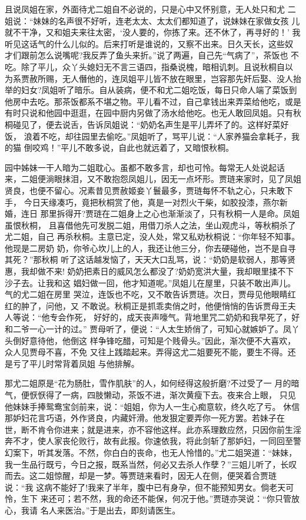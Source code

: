 且说凤姐在家，外面待尤二姐自不必说的，只是心中又怀别意，无人处只和尤
二姐说：“妹妹的名声很不好听，连老太太、太太们都知道了，说妹妹在家做女孩
儿就不干净，又和姐夫来往太密，‘没人要的，你拣了来。还不休了，再寻好的！’
我听见这话气的什么儿似的。后来打听是谁说的，又察不出来。日久天长，这些奴
才们跟前怎么说嘴呢?我反弄了鱼头来折。”说了两遍，自己先“气病了”，茶饭也
不吃。除了平儿，众丫头媳妇无不言三语四，指桑说槐，暗相讥刺。且说秋桐自以
为系贾赦所赐，无人僭他的，连凤姐平儿皆不放在眼里，岂容那先奸后娶、没人抬
举的妇女?凤姐听了暗乐。自从装病，便不和尤二姐吃饭，每日只命人端了菜饭到
他房中去吃。那茶饭都系不堪之物。平儿看不过，自己拿钱出来弄菜给他吃，或是
有时只说和他园中逛逛，在园中厨内另做了汤水给他吃。也无人敢回凤姐。只有秋
桐碰见了，便去说舌，告诉凤姐说：“奶奶名声生是平儿弄坏了的。这样好菜好饭，
浪着不吃，却往园里去偷吃。”凤姐听了，骂平儿说：“人家养猫会拿耗子，我的猫
倒咬鸡！”平儿不敢多说，自此也就远着了，又暗恨秋桐。

园中姊妹一干人暗为二姐耽心。虽都不敢多言，却也可怜。每常无人处说起话
来，二姐便淌眼抹泪，又不敢抱怨凤姐儿，因无一点坏形。贾琏来家时，见了凤姐
贤良，也便不留心。况素昔见贾赦姬妾丫鬟最多，贾琏每怀不轨之心，只未敢下手，
今日天缘凑巧，竟把秋桐赏了他，真是一对烈火干柴，如胶投漆，燕尔新婚，连日
那里拆得开?贾琏在二姐身上之心也渐渐淡了，只有秋桐一人是命。凤姐虽恨秋桐，
且喜借他先可发脱二姐，用借刀杀人之法，坐山观虎斗，等秋桐杀了尤二姐，自己
再杀秋桐。主意已定，没人处，常又私劝秋桐说：“你年轻不知事。他现是二房奶
奶，你爷心坎儿上的人，我还让他三分，你去硬碰他，岂不是自寻其死？”那秋桐
听了这话越发恼了，天天大口乱骂，说：“奶奶是软弱人，那等贤惠，我却做不来!
奶奶把素日的威风怎么都没了?奶奶宽洪大量，我却眼里揉不下沙子去。让我和这
娼妇做一回，他才知道呢。”凤姐儿在屋里，只装不敢出声儿。气的尤二姐在房里
哭泣，连饭也不吃，又不敢告诉贾琏。次日，贾母见他眼睛红红的肿了，问他，又
不敢说。秋桐正是抓乖卖俏之时，他便悄悄的告诉贾母王夫人等说：“他专会作死，
好好的，成天丧声嚎气。背地里咒二奶奶和我早死了，好和二爷一心一计的过。”
贾母听了，便说：“人太生娇俏了，可知心就嫉妒了。凤丫头倒好意待他，他倒这
样争锋吃醋，可知是个贱骨头。”因此，渐次便不大喜欢，众人见贾母不喜，不免
又往上践踏起来。弄得这尤二姐要死不能，要生不得。还是亏了平儿时常背着凤姐
与他排解。

那尤二姐原是“花为肠肚，雪作肌肤”的人，如何经得这般折磨?不过受了一
月的暗气，便恹恹得了一病，四肢懒动，茶饭不进，渐次黄瘦下去。夜来合上眼，
只见他妹妹手捧鸳鸯宝剑前来，说：“姐姐，你为人一生心痴意软，终久吃了亏。
休信那妒妇花言巧语，外作贤良，内藏奸滑。他发狠定要弄你一死方罢。若妹子在
世，断不肯令你进来；就是进来，亦不容他这样。此亦系理数应然，只因你前生淫
奔不才，使人家丧伦败行，故有此报。你速依我，将此剑斩了那妒妇，一同回至警
幻案下，听其发落。不然，你白白的丧命，也无人怜惜的。”尤二姐哭道：“妹妹，
我一生品行既亏，今日之报，既系当然，何必又去杀人作孽？”三姐儿听了，长叹
而去。这二姐惊醒，却是一梦。等贾琏来看时，因无人在侧，便哭着合贾琏说：“我
这病不能好了!我来了半年，腹中已有身孕，但不能预知男女。倘老天可怜，生下
来还可；若不然，我的命还不能保，何况于他。”贾琏亦哭说：“你只管放心，我请
名人来医治。”于是出去，即刻请医生。

